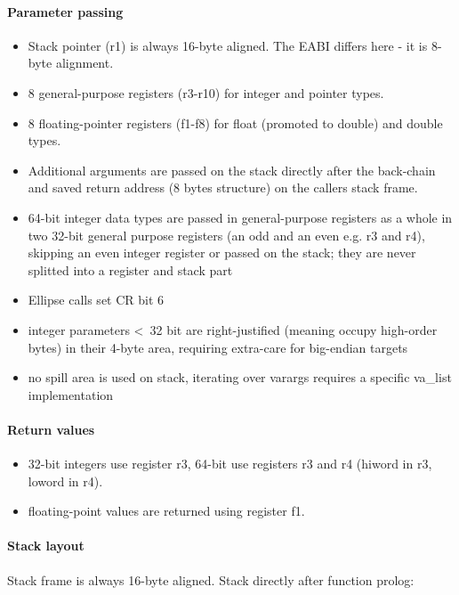 \paragraph{Parameter passing}

\begin{itemize}
\item Stack pointer (r1) is always 16-byte aligned. The EABI differs here - it is 8-byte alignment.
\item 8 general-purpose registers (r3-r10) for integer and pointer types.
\item 8 floating-pointer registers (f1-f8) for float (promoted to double) and double types.
\item Additional arguments are passed on the stack directly after the back-chain and saved return address (8 bytes structure) on the callers stack frame.
\item 64-bit integer data types are passed in general-purpose registers as a whole in two
 32-bit general purpose registers (an odd and an even e.g. r3 and r4), skipping an even integer register
 or passed on the stack; they are never splitted into a register and stack part
\item Ellipse calls set CR bit 6 
\item integer parameters \textless\ 32 bit are right-justified (meaning occupy high-order bytes) in their 4-byte area, requiring extra-care for big-endian targets
\item no spill area is used on stack, iterating over varargs requires a specific va\_list implementation
\end{itemize}

\paragraph{Return values}

\begin{itemize}
\item 32-bit integers use register r3, 64-bit use registers r3 and r4 (hiword in r3, loword in r4).
\item floating-point values are returned using register f1.
\end{itemize}


\paragraph{Stack layout}

Stack frame is always 16-byte aligned. Stack directly after function prolog:\\

